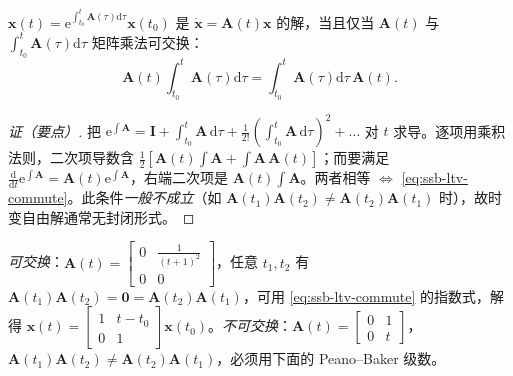 \begin{theorem}[时变指数解的成立条件]\label{thm:ssb-ltv-commute}
$\mathbf{x}(t)=\mathrm{e}^{\int_{t_0}^t\mathbf{A}(\tau)\mathrm{d}\tau}\mathbf{x}(t_0)$ 是 $\dot{\mathbf{x}}=\mathbf{A}(t)\mathbf{x}$ 的解，当且仅当 $\mathbf{A}(t)$ 与 $\int_{t_0}^t\mathbf{A}(\tau)\mathrm{d}\tau$ 矩阵乘法可交换：
\begin{equation}
  \mathbf{A}(t)\!\int_{t_0}^t\!\mathbf{A}(\tau)\mathrm{d}\tau=\int_{t_0}^t\!\mathbf{A}(\tau)\mathrm{d}\tau\,\mathbf{A}(t).
  \label{eq:ssb-ltv-commute}
\end{equation}
\end{theorem}
\begin{proof}[证（要点）]
把 $\mathrm{e}^{\int\mathbf{A}}=\mathbf{I}+\int_{t_0}^t\mathbf{A}\,\mathrm{d}\tau+\tfrac{1}{2!}(\int_{t_0}^t\mathbf{A}\,\mathrm{d}\tau)^2+\dots$ 对 $t$ 求导。逐项用乘积法则，二次项导数含 $\tfrac12[\mathbf{A}(t)\!\int\mathbf{A}+\int\mathbf{A}\,\mathbf{A}(t)]$；而要满足 $\tfrac{\mathrm{d}}{\mathrm{d}t}\mathrm{e}^{\int\mathbf{A}}=\mathbf{A}(t)\mathrm{e}^{\int\mathbf{A}}$，右端二次项是 $\mathbf{A}(t)\!\int\mathbf{A}$。两者相等 $\iff$ \cref{eq:ssb-ltv-commute}。此条件\emph{一般不成立}（如 $\mathbf{A}(t_1)\mathbf{A}(t_2)\neq\mathbf{A}(t_2)\mathbf{A}(t_1)$ 时），故时变自由解通常无封闭形式。
\end{proof}

\begin{example}\label{ex:ssb-ltv-commute}
\emph{可交换}：$\mathbf{A}(t)=\begin{bmatrix}0&\tfrac{1}{(t+1)^2}\\0&0\end{bmatrix}$，任意 $t_1,t_2$ 有 $\mathbf{A}(t_1)\mathbf{A}(t_2)=\mathbf{0}=\mathbf{A}(t_2)\mathbf{A}(t_1)$，可用 \cref{eq:ssb-ltv-commute} 的指数式，解得 $\mathbf{x}(t)=\begin{bmatrix}1&t-t_0\\0&1\end{bmatrix}\mathbf{x}(t_0)$。\emph{不可交换}：$\mathbf{A}(t)=\begin{bmatrix}0&1\\0&t\end{bmatrix}$，$\mathbf{A}(t_1)\mathbf{A}(t_2)\neq\mathbf{A}(t_2)\mathbf{A}(t_1)$，必须用下面的 Peano--Baker 级数。
\end{example}

